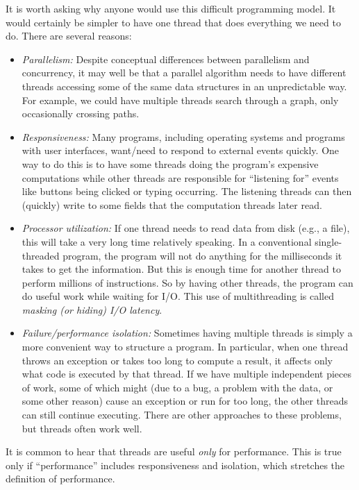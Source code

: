 \documentclass[10pt]{article}
\begin{document}
It is worth asking why anyone would use this difficult programming
model.  It would certainly be simpler to have one thread that does
everything we need to do.  There are several reasons:
\begin{itemize}
\item \emph{Parallelism:} Despite conceptual differences between
  parallelism and concurrency, it may well be that a parallel
  algorithm needs to have different threads accessing some of the same
  data structures in an unpredictable way.  For example, we could have
  multiple threads search through a graph, only occasionally crossing
  paths.
\item \emph{Responsiveness:} Many programs, including operating systems and
  programs with user interfaces, want/need to respond to external
  events quickly.  One way to do this is to have some threads doing
  the program's expensive computations while other threads are
  responsible for ``listening for'' events like buttons being clicked
  or typing occurring.  The listening threads can then (quickly) write
  to some fields that the computation threads later read.
\item \emph{Processor utilization:} If one thread needs to read data from
  disk (e.g., a file), this will take a very long time relatively
  speaking.  In a conventional single-threaded program, the program
  will not do anything for the milliseconds it takes to get the
  information.  But this is enough time for another thread to perform
  millions of instructions.  So by having other threads, the
  program can do useful work while waiting for I/O\@.  This use of
  multithreading is called \emph{masking (or hiding) I/O latency}.
\item \emph{Failure/performance isolation:} Sometimes having multiple threads
  is simply a more convenient way to structure a program.  In
  particular, when one thread throws an exception or takes too long to
  compute a result, it affects only what code is executed by that
  thread.  If we have multiple independent pieces of work, some of
  which might (due to a bug, a problem with the data, or some other
  reason) cause an exception or run for too long, the other threads
  can still continue executing.  There are other approaches to these
  problems, but threads often work well.
\end{itemize}
It is common to hear that threads are useful \emph{only} for performance.
This is true only if ``performance'' includes responsiveness and
isolation, which stretches the definition of performance.
\end{document}
